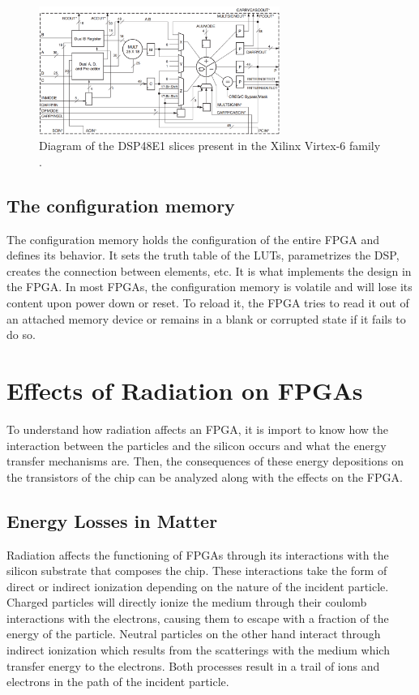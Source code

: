      \begin{figure}[h!]
        \centering
        \includegraphics[width=0.7\textwidth]{img/II-5-irradiation/dsp.png}
        \caption{Diagram of the DSP48E1 slices present in the Xilinx Virtex-6 family \cite{VIRTEX-DSP}.}
        \label{fig:II-5-dsp}
      \end{figure}

    \subsection{The configuration memory}

      The configuration memory holds the configuration of the entire FPGA and defines its behavior. It sets the truth table of the LUTs, parametrizes the DSP, creates the connection between elements, etc. It is what implements the design in the FPGA. In most FPGAs, the configuration memory is volatile and will lose its content upon power down or reset. To reload it, the FPGA tries to read it out of an attached memory device or remains in a blank or corrupted state if it fails to do so.

  \section{Effects of Radiation on FPGAs}

    To understand how radiation affects an FPGA, it is import to know how the interaction between the particles and the silicon occurs and what the energy transfer mechanisms are. Then, the consequences of these energy depositions on the transistors of the chip can be analyzed along with the effects on the FPGA.

    \subsection{Energy Losses in Matter}

      Radiation affects the functioning of FPGAs through its interactions with the silicon substrate that composes the chip. These interactions take the form of direct or indirect ionization depending on the nature of the incident particle. Charged particles will directly ionize the medium through their coulomb interactions with the electrons, causing them to escape with a fraction of the energy of the particle. Neutral particles on the other hand interact through indirect ionization which results from the scatterings with the medium which transfer energy to the electrons. Both processes result in a trail of ions and electrons in the path of the incident particle. \\

